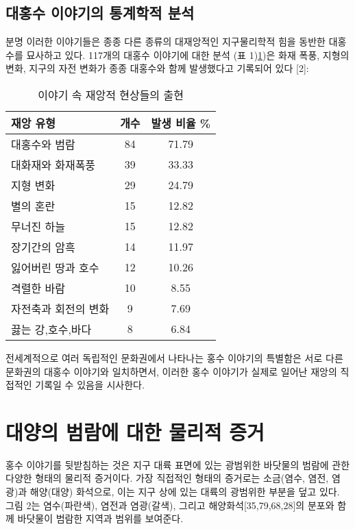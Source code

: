 \documentclass[10pt,twocolumn,letterpaper]{article}
\begin{document}
\begin{개요}
\subsection{대홍수 이야기의 통계학적 분석}

분명  이러한 이야기들은 종종 다른 종류의 대재앙적인 지구물리학적 힘을 동반한 대홍수를 묘사하고 있다. 117개의 대홍수 이야기에 대한 분석 (표 1)\ref{tab: 1})은 화재 폭풍, 지형의 변화, 지구의 자전 변화가 종종 대홍수와 함께 발생했다고 기록되어 있다 [2]\cite{14}:

\begin{table}[ht]
\begin{center}
\renewcommand{\arraystretch}{1.2}  
\begin{tabular}{|l|c|c|}
\hline
\textbf{재앙 유형} & \textbf{개수} & \textbf{발생 비율 \%} \\
\hline\hline
대홍수와 범람                   & 84 & 71.79 \\
대화재와 화재폭풍         & 39 & 33.33 \\
지형 변화               & 29 & 24.79 \\
별의 혼란               & 15 & 12.82 \\
무너진 하늘               & 15 & 12.82 \\
장기간의 암흑               & 14 & 11.97 \\
잃어버린 땅과 호수      & 12 & 10.26 \\
격렬한 바람           & 10 & 8.55  \\
자전축과 회전의 변화            & 9 & 7.69  \\
끓는 강,호수,바다       & 8 & 6.84 \\
\hline
\end{tabular}
\end{center}
\caption{이야기 속 재앙적 현상들의 출현 }
\label{tab: 1}
\end{table}

전세계적으로 여러 독립적인 문화권에서 나타나는 홍수 이야기의 특별함은  서로 다른 문화권의 대홍수 이야기와 일치하면서, 이러한 홍수 이야기가 실제로 일어난 재앙의 직접적인 기록일 수 있음을 시사한다.

\section{대양의 범람에 대한 물리적 증거}

홍수 이야기를 뒷받침하는 것은 지구 대륙 표면에 있는 광범위한 바닷물의 범람에 관한 다양한 형태의 물리적 증거이다. 가장 직접적인 형태의 증거로는  소금(염수, 염전, 염광)과 해양(대양) 화석으로, 이는 지구 상에 있는 대륙의 광범위한 부분을 덮고 있다. 그림 2는 염수(파란색), 염전과 염광(갈색), 그리고 해양화석[35,79,68,28]의 분포와 함께 바닷물이 범람한 지역과 범위를 보여준다.


\end{개요}
\end{document}
